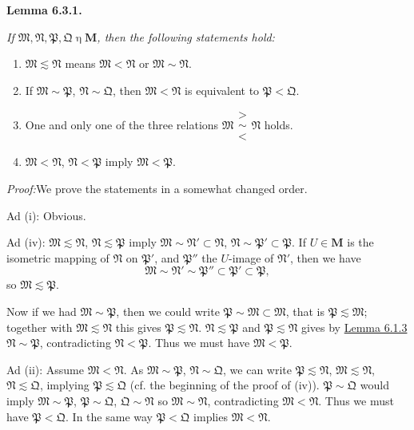 \documentclass[12pt,b5paper,twoside]{article}
\newcommand{\M}{\mathbf M}
\newcommand{\Lemma}[1]{%
  \par\smallskip\noindent\phantomsection\label{lem:#1}\textbf{Lemma #1.}\enspace
}
\newcommand{\Proof}{\par\noindent\textit{Proof:}\enspace}
\newcommand{\lemref}[1]{\hyperref[lem:#1]{Lemma #1}}
\begin{document}
\Lemma{6.3.1} {\itshape
If \(\mathfrak M,\mathfrak N,\mathfrak P,\mathfrak Q\mathbin{\eta}\M\),
then the following statements hold:
\begin{enumerate}[label=(\roman*)]
 \item \(\mathfrak M\lesssim\mathfrak N\) means
   \(\mathfrak M<\mathfrak N\) or \(\mathfrak M\sim\mathfrak N\).
 \item If \(\mathfrak M\sim\mathfrak P\),
   \(\mathfrak N\sim\mathfrak Q\), then
   \(\mathfrak M<\mathfrak N\) is equivalent to
   \(\mathfrak P<\mathfrak Q\).
 \item One and only one of the three relations
   \(\mathfrak M\mathrel{\substack{>\\[-0.7ex]\sim\\[-0.7ex]<}}\mathfrak N\)
   holds.
 \item \(\mathfrak M<\mathfrak N\), \(\mathfrak N<\mathfrak P\) imply
   \(\mathfrak M<\mathfrak P\).
\end{enumerate}
}

\Proof We prove the statements in a somewhat changed order.

Ad (i): Obvious.

Ad (iv): \(\mathfrak M\lesssim\mathfrak N\),
\(\mathfrak N\lesssim\mathfrak P\) imply
\(\mathfrak M\sim\mathfrak N'\subset\mathfrak N\),
\(\mathfrak N\sim\mathfrak P'\subset\mathfrak P\). If \(U\in\M\) is
the isometric mapping of \(\mathfrak N\) on \(\mathfrak P'\), and
\(\mathfrak P''\) the \(U\)-image of \(\mathfrak N'\), then we have
\[
 \mathfrak M\sim\mathfrak N'\sim\mathfrak P''
 \subset\mathfrak P'\subset\mathfrak P,
\]
so \(\mathfrak M\lesssim\mathfrak P\).

Now if we had \(\mathfrak M\sim\mathfrak P\), then we could write
\(\mathfrak P\sim\mathfrak M\subset\mathfrak M\), that is
\(\mathfrak P\lesssim\mathfrak M\); together with
\(\mathfrak M\lesssim\mathfrak N\) this gives
\(\mathfrak P\lesssim\mathfrak N\). \(\mathfrak N\lesssim\mathfrak P\)
and \(\mathfrak P\lesssim\mathfrak N\) gives by \lemref{6.1.3}
\(\mathfrak N\sim\mathfrak P\), contradicting
\(\mathfrak N<\mathfrak P\). Thus we must have
\(\mathfrak M<\mathfrak P\).

Ad (ii): Assume \(\mathfrak M<\mathfrak N\). As
\(\mathfrak M\sim\mathfrak P\), \(\mathfrak N\sim\mathfrak Q\), we can
write \(\mathfrak P\lesssim\mathfrak N\),
\(\mathfrak M\lesssim\mathfrak N\),
\(\mathfrak N\lesssim\mathfrak Q\), implying
\(\mathfrak P\lesssim\mathfrak Q\) (cf. the beginning of the proof of
(iv)). \(\mathfrak P\sim\mathfrak Q\) would imply
\(\mathfrak M\sim\mathfrak P\), \(\mathfrak P\sim\mathfrak Q\),
\(\mathfrak Q\sim\mathfrak N\) so \(\mathfrak M\sim\mathfrak N\),
contradicting \(\mathfrak M<\mathfrak N\). Thus we must have
\(\mathfrak P<\mathfrak Q\). In the same way
\(\mathfrak P<\mathfrak Q\) implies \(\mathfrak M<\mathfrak N\).
\end{document}
